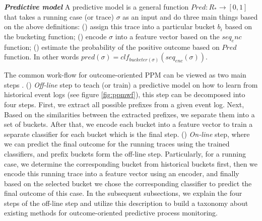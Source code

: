 \begin{definition}{\textit{\textbf{Predictive model}}}
	A predictive model is a general function $Pred: R_* \to [0,1]$ that takes a running case (or trace) $\sigma$ as an input and do three main things based on the above definitions: () assign this trace into a particular bucket $b_i$ based on the bucketing function;  () encode $\sigma$ into a feature vector based on the $seq_enc$ function; () estimate the probability of the positive outcome based on $Pred$ function.  In other words $pred (\sigma) = clf_{bucketer(\sigma)}(seq_{enc}(\sigma))$.	 		
\end{definition}
 
 
The common work-flow for outcome-oriented PPM can be viewed as two main steps \cite{teinemaa2019outcome}. () \textit{Off-line} step to teach (or train) a predictive model on how to learn from historical event logs (see figure \ref{fig:ppmwf}), this step can be decomposed into four steps. First, we extract all possible prefixes from a given event log. Next, Based on the similarities between the extracted prefixes, we separate them into a set of buckets. After that, we encode each bucket into a feature vector to train a separate classifier for each bucket which is the final step. () \textit{On-line} step, where we can predict the final outcome for the running traces using the trained classifiers, and prefix buckets form the off-line step. Particularly, for a running case, we determine the corresponding bucket from historical buckets first, then we encode this running trace into a feature vector using an encoder, and finally based on the selected bucket we chose the corresponding classifier to predict the final outcome of this case.  In the subsequent subsections, we explain the four steps of the off-line step and utilize this description to build a taxonomy about existing methods for outcome-oriented predictive process monitoring. 


